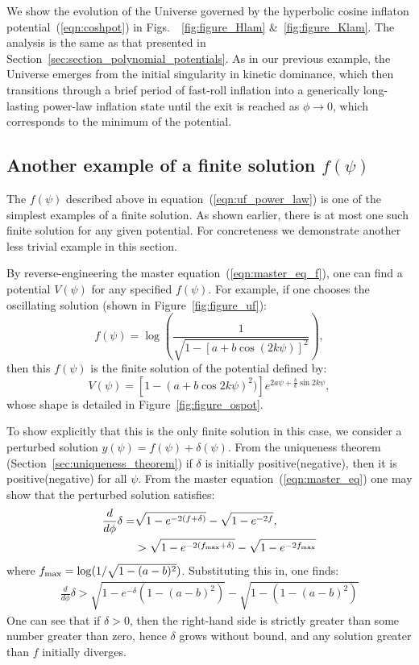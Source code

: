 We show the evolution of the Universe governed by the hyperbolic cosine inflaton potential~(\ref{eqn:coshpot}) in Figs.\ ~\ref{fig:figure_Hlam} \&~\ref{fig:figure_Klam}. The analysis is the same as that presented in Section~\ref{sec:section_polynomial_potentials}.  As in our previous example, the Universe emerges from the initial singularity in kinetic dominance, which then transitions through a brief period of fast-roll inflation into a generically long-lasting power-law inflation state until the exit is reached as $\phi\rightarrow0$, which corresponds to the minimum of the potential.  

\subsection{Another example of a finite solution $f(\psi)$}
The $f(\psi)$ described above in equation~(\ref{eqn:uf_power_law}) is one of the simplest examples of a finite solution. As shown earlier, there is at most one such finite solution for any given potential. For concreteness we demonstrate another less trivial example in this section.

By reverse-engineering the master equation~(\ref{eqn:master_eq_f}), one can find a potential $V(\psi)$ for any specified $f(\psi)$. For example, if one chooses the oscillating solution (shown in Figure~\ref{fig:figure_uf}):
%
\begin{equation}
  f(\psi) = \log\left( \frac{1}{\sqrt{1-[a+b\cos(2k\psi)]^2}}\right),
  \label{eqn:uf_example}
\end{equation}
%
then this $f(\psi)$ is the finite solution of the potential defined by:
%
\begin{equation}
	V(\psi)
    =
    \left[ 1-(a+b \cos2k\psi)^2) \right]
    e^{2 a \psi +\frac{b}{k} \sin 2k\psi},
    \label{eqn:Vphi_uf_example}
\end{equation}
whose shape is detailed in Figure~\ref{fig:figure_ospot}.
%

To show explicitly that this is the only finite solution in this case, we consider a perturbed solution $y(\psi) = f(\psi)+\delta(\psi)$.  From the uniqueness theorem (Section~\ref{sec:uniqueness_theorem}) if $\delta$ is initially positive(negative), then it is positive(negative) for all $\psi$. From the master equation~(\ref{eqn:master_eq}) one may show that the perturbed solution satisfies:
%
\begin{align}
  \frac{d}{d\phi}\delta 
  =& 
  \sqrt{1-e^{-2(f+\delta)}} -\sqrt{1-e^{-2f}}, 
  \label{eqn:perturb}
  \\
  &>
  \sqrt{1-e^{-2(f_\mathrm{max}+\delta)}} -\sqrt{1-e^{-2f_\mathrm{max}}}
\end{align}
%
where $f_\mathrm{max} = \log(1/\sqrt{1-(a-b)^2})$. Substituting this in, one finds:
%
\begin{align}
  \frac{d}{d\phi}\delta 
  > 
  \sqrt{1-e^{-\delta}({1-(a-b)^2})} - \sqrt{1-({1-(a-b)^2})}
\end{align}
%
One can see that if $\delta>0$, then the right-hand side is strictly greater than some number greater than zero, hence $\delta$ grows without bound, and any solution greater than $f$ initially diverges. 

